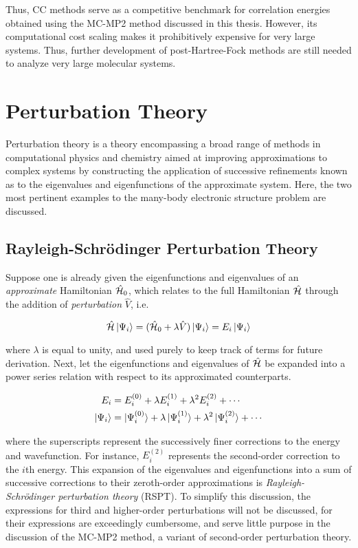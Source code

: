 Thus, CC methods serve as a competitive benchmark for correlation energies
obtained using the MC-MP2 method discussed in this thesis. However, its
computational cost scaling makes it prohibitively expensive for very large
systems. Thus, further development of post-Hartree-Fock methods are still needed
to analyze very large molecular systems.

\section{Perturbation Theory}
\label{s:pt}

Perturbation theory is a theory encompassing a broad range of methods in
computational physics and chemistry aimed at improving approximations to complex
systems by constructing the application of successive refinements known as to
the eigenvalues and eigenfunctions of the approximate system. Here, the two most
pertinent examples to the many-body electronic structure problem are discussed.

\subsection{Rayleigh-Schr{\"o}dinger Perturbation Theory}

Suppose one is already given the eigenfunctions and eigenvalues of an
\emph{approximate} Hamiltonian $\hat{\mathcal{H}}_0$, which relates to the full Hamiltonian
$\hat{\mathcal{H}}$ through the addition of \emph{perturbation} $\hat V$, i.e.

\begin{equation}
	\hat{\mathcal{H}}\ket{\Psi_i} = (\hat{\mathcal{H}}_0 + \lambda\hat V) \ket{\Psi_i} = E_i \ket{\Psi_i}
	\label{eq:pt}
\end{equation}

\noindent where $\lambda$ is equal to unity, and used purely to keep track of
terms for future derivation. Next, let the eigenfunctions and eigenvalues of
$\hat{\mathcal{H}}$ be expanded into a power series relation with respect to its
approximated counterparts.

\begin{align}
	\label{eq:e-pt}
	E_i &= E^{(0)}_i + \lambda E^{(1)}_i + \lambda^2 E^{(2)}_i + \cdots \\
	\label{eq:psi-pt}
	\ket{\Psi_i} &= \ket{\Psi^{(0)}_i} + \lambda \ket{\Psi^{(1)}_i} + \lambda^2 \ket{\Psi^{(2)}_i} + \cdots
\end{align}

\noindent where the superscripts represent the successively finer corrections to
the energy and wavefunction. For instance, $E_i^{(2)}$ represents the
second-order correction to the $i$th energy. This expansion of the eigenvalues
and eigenfunctions into a sum of successive corrections to their zeroth-order
approximations is \emph{Rayleigh-Schr{\"o}dinger perturbation theory} (RSPT). To
simplify this discussion, the expressions for third and higher-order
perturbations will not be discussed, for their expressions are exceedingly
cumbersome, and serve little purpose in the discussion of the MC-MP2 method, a
variant of second-order perturbation theory.

